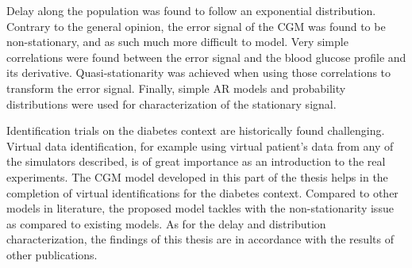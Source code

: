 Delay along the population was found to follow an exponential distribution. Contrary to the general opinion, the error signal of the CGM was found to be non-stationary, and as such much more difficult to model. Very simple correlations were found between the error signal and the blood glucose profile and its derivative. Quasi-stationarity was achieved when using those correlations to transform the error signal. Finally, simple AR models and probability distributions were used for characterization of the stationary signal.

Identification trials on the diabetes context are historically found challenging. Virtual data identification, for example using virtual patient's data from any of the simulators described, is of great importance as an introduction to the real experiments. The CGM model developed in this part of the thesis helps in the completion of virtual identifications for the diabetes context. Compared to other models in literature, the proposed model tackles with the non-stationarity issue as compared to existing models. As for the delay and distribution characterization, the findings of this thesis are in accordance with the results of other publications.




